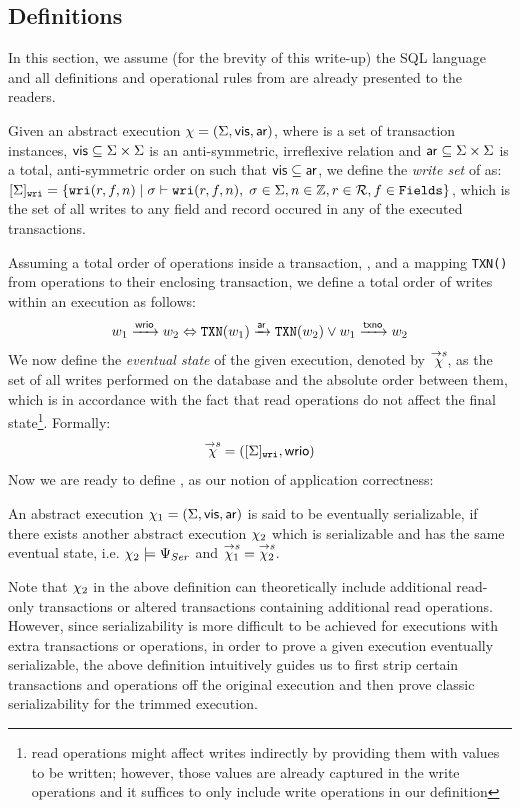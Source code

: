 \documentclass{vldb}
\begin{document}
\subsection {Definitions}
In this section, we assume (for the brevity of this
write-up) the SQL language and all definitions and operational rules from \cite{Nagar:ser}
are already presented to the readers. 

Given an abstract execution $ \chi = (\Sigma, \mathsf{vis}, \mathsf{ar})$, where \txns is a set of 
transaction instances, $\mathsf{vis} \subseteq \Sigma \times \Sigma$ is an anti-symmetric, irreflexive relation
and $\mathsf{ar} \subseteq \Sigma \times \Sigma $ is a total, anti-symmetric
order on \txns such that $\mathsf{vis} \subseteq \mathsf{ar}$, we define the \emph{write
set} of \txns as:
$ [\Sigma]_{\texttt{wri}} = \{\texttt{wri}(r,f,n) \;|\; \sigma \vdash
  \texttt{wri}(r,f,n),\;
\sigma \in \Sigma, n \in \mathbb{Z}, r \in \mathcal{R}, f \in \texttt{Fields}  \} $, which is
the set of all writes to any field and record occured in any of the
executed transactions.

Assuming a total order of operations inside a transaction, \txno, and
a mapping \texttt{TXN()} from operations to their enclosing
transaction, we define a total order of writes within an execution as
follows: 
$$ w_1 \xrightarrow{\mathsf{wrio}} w_2  \Leftrightarrow \texttt{TXN}(w_1)
\xrightarrow{\mathsf{ar}} \texttt{TXN}(w_2)  \vee w_1 \xrightarrow{\mathsf{txno}} w_2$$
We now define the \emph{eventual state} of the given execution,
denoted by $\overset{\rightarrow s}{\chi}$, as the set of all writes performed on the database
and the absolute order between them, which is in accordance with the
fact that read operations do not affect the final state\footnote{read operations might 
affect writes indirectly by
providing them with values to be written; however, those values are already
captured in the write operations and it suffices to only include
write operations in our definition}. Formally:
  $$\overset{\rightarrow s}{\chi} = ([\Sigma]_{\texttt{wri}},\mathsf{wrio}) $$
Now we are ready to define \es, as our notion of application
correctness:

\begin{definition} 
  An abstract execution $ \chi_1 = (\Sigma, \mathsf{vis},\mathsf{ar})$
  is said to be eventually serializable, if there exists another
  abstract execution $\chi_2$ which is serializable and has the same eventual state, i.e. 
  $\chi_2 \models \Psi_{Ser} $ and $\overset{\rightarrow s}{\chi_1}=
  \overset{\rightarrow s}{\chi_2}$.
\end{definition}
Note that $\chi_2$ in the above definition can theoretically include 
additional read-only transactions or altered transactions containing
additional read operations. However, since serializability is more
difficult to be achieved for executions with extra transactions or
operations, in order to prove a given execution eventually
serializable, the above definition intuitively guides us to first strip  certain
transactions and operations off the original execution and then prove
classic serializability for the trimmed execution.
\end{document}
